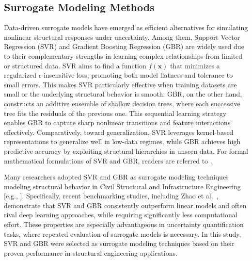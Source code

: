 \documentclass[authoryear,preprint,review,12pt]{elsarticle}
\begin{document}
\subsection{Surrogate Modeling Methods}
Data-driven surrogate models have emerged as efficient alternatives for simulating nonlinear structural responses under uncertainty. Among them, Support Vector Regression (SVR) and Gradient Boosting Regression (GBR) are widely used due to their complementary strengths in learning complex relationships from limited or structured data. SVR aims to find a function $f(\bm{x})$ that minimizes a regularized $\epsilon$-insensitive loss, promoting both model flatness and tolerance to small errors. This makes SVR particularly effective when training datasets are small or the underlying structural behavior is smooth. GBR, on the other hand, constructs an additive ensemble of shallow decision trees, where each successive tree fits the residuals of the previous one. This sequential learning strategy enables GBR to capture sharp nonlinear transitions and feature interactions effectively. Comparatively, toward generalization, SVR leverages kernel-based representations to generalize well in low-data regimes, while GBR achieves high predictive accuracy by exploiting structural hierarchies in unseen data. For formal mathematical formulations of SVR and GBR, readers are referred to \citep{Smola2004SVR,Friedman2001GBR}.

Many researchers adopted SVR and GBR as surrogate modeling techniques modeling structural behavior in Civil Structural and Infrastructure Engineering [e.g., \citep{xu2020surrogate,wang2022machine}]. Specifically, recent benchmarking studies, including Zhao et al.\ \citep{Zhao2023}, demonstrate that SVR and GBR consistently outperform linear models and often rival deep learning approaches, while requiring significantly less computational effort. These properties are especially advantageous in uncertainty quantification tasks, where repeated evaluation of surrogate models is necessary. In this study, SVR and GBR were selected as surrogate modeling techniques based on their proven performance in structural engineering applications. 
\end{document}
